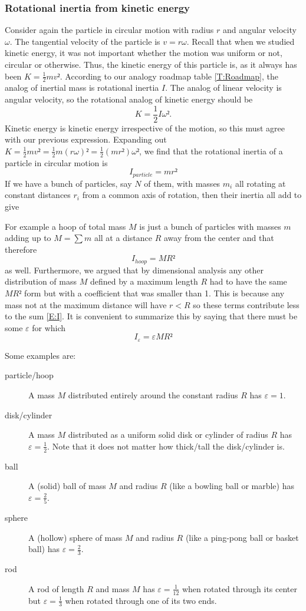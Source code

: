 \subsubsection{Rotational inertia from kinetic energy}
Consider again the particle in circular motion with radius $r$ and angular velocity $ω$. The tangential velocity of the particle is $v=r ω$. Recall that when we studied kinetic energy, it was not important whether the motion was uniform or not, circular or otherwise. Thus, the kinetic energy of this particle is, as it always has been $K=\frac12 m v²$. According to our analogy roadmap table \ref{T:Roadmap}, the analog of inertial mass is rotational inertia $I$. The analog of linear velocity is angular velocity, so the rotational analog of kinetic energy should be 
$$
K=\frac12 I ω². 
$$
Kinetic energy is kinetic energy irrespective of the motion, so this must agree with our previous expression. Expanding out $K=\frac12 m v²=\frac12 m(rω)²=\frac12 (mr²)ω²$, we find that the rotational inertia of a particle in circular motion is 
$$
I_{particle} = mr² 
$$
If we have a bunch of particles, say $N$ of them, with masses $m_i$ all rotating at constant distances $r_i$ from a common axis of rotation, then their inertia all add to give

For example a hoop of total mass $M$ is just a bunch of particles with masses $m$ adding up to $M=∑ m$ all at a distance $R$ away from the center and that therefore 
$$
I_{hoop} = MR² 
$$
as well. Furthermore, we argued that by dimensional analysis any other distribution of mass $M$ defined by a maximum length $R$ had to have the same $MR²$ form but with a coefficient that was smaller than 1. This is because any mass not at the maximum distance will have $r<R$ so these terms contribute less to the sum \eqref{E:I}. 
It is convenient to summarize this by saying that there must be some $ε$ for which 
$$
I_ε = ε MR² 
$$

Some examples are: 
\begin{description}
	\item[particle/hoop] A mass $M$ distributed entirely around the constant radius $R$ has $ε =1$.
	\item[disk/cylinder] A mass $M$ distributed as a uniform solid disk or cylinder of radius $R$ has $ε =\frac12$. Note that it does not matter how thick/tall the disk/cylinder is.
	\item[ball] A (solid) ball of mass $M$ and radius $R$ (like a bowling ball or marble) has $ε = \frac25$.
	\item[sphere] A (hollow) sphere of mass $M$ and radius $R$ (like a ping-pong ball or basket ball) has $ε = \frac23$.
	\item[rod] A rod of length $R$ and mass $M$ has $ε =\frac1{12}$ when rotated through its center but $ε =\frac13$ when rotated through one of its two ends. 
\end{description}

